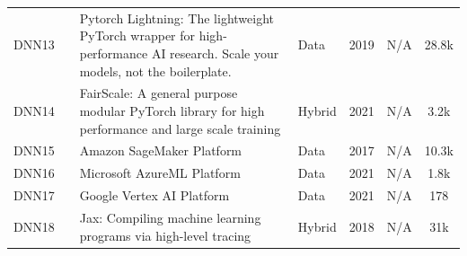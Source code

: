 \begin{table}[th!]
\begin{tabular}{llp{8.4cm}lllc}
		\small DNN13       & \small \cite{noauthor_overview_nodate}  & \small Pytorch Lightning: The lightweight PyTorch wrapper for high-performance AI research. Scale your models, not the boilerplate. & \small Data          & \small 2019          & \small N/A                & \small 28.8k \cite{falcon_pytorch_2019}                              \\[1ex]
		\small DNN14       & \small \cite{noauthor_fairscale_nodate} & \small FairScale:  A general purpose modular PyTorch library for high performance and large scale training                          & \small Hybrid        & \small 2021          & \small N/A                & \small 3.2k \cite{FairScale2021}                                     \\[1ex]
		\small DNN15       & \small \cite{noauthor_amazon_nodate}    & \small Amazon SageMaker Platform                                                                                                    & \small Data          & \small 2017          & \small N/A                & \small 10.3k \cite{noauthor_awsamazon-sagemaker-examples_2025}       \\[1ex]
		\small DNN16       & \small \cite{sdgilley_azure_nodate}     & \small Microsoft AzureML Platform                                                                                                   & \small Data          & \small 2021          & \small N/A                & \small 1.8k \cite{noauthor_azureazureml-examples_2025}               \\[1ex]
		\small DNN17       & \small \cite{noauthor_vertex_nodate}    & \small Google Vertex AI Platform                                                                                                    & \small Data          & \small 2021          & \small N/A                & \small 178 \cite{noauthor_googlecloudplatformvertex-ai-samples_2025} \\[1ex]
		\small DNN18       & \small \cite{frostig_compiling_nodate}  & \small Jax: Compiling machine learning programs via high-level tracing                                                              & \small Hybrid        & \small 2018          & \small N/A                & \small 31k \cite{noauthor_jax-mljax_2025}                            \\[1ex]
		\hline
	\end{tabular}
\end{table}

